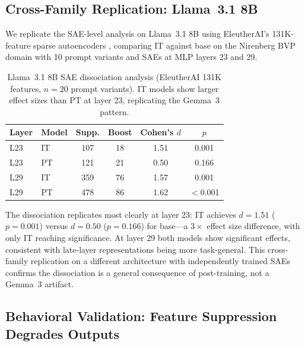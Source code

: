 \documentclass[10pt,twocolumn]{article}
\newcommand{\gemma}{Gemma~3\xspace}
\begin{document}
\subsection{Cross-Family Replication: Llama~3.1 8B}
\label{sec:llama_replication}

We replicate the SAE-level analysis on Llama~3.1 8B using EleutherAI's 131K-feature sparse autoencoders \citep{gao2024scaling}, comparing IT against base on the Nirenberg BVP domain with 10 prompt variants and SAEs at MLP layers 23 and 29.

\begin{table}[t]
\centering
\caption{Llama~3.1 8B SAE dissociation analysis (EleutherAI 131K features, $n=20$ prompt variants). IT models show larger effect sizes than PT at layer 23, replicating the \gemma pattern.}
\label{tab:llama_sae}
\small
\begin{tabular}{@{}llcccc@{}}
\toprule
\textbf{Layer} & \textbf{Model} & \textbf{Supp.} & \textbf{Boost} & \textbf{Cohen's $d$} & \textbf{$p$} \\
\midrule
L23 & IT  & 107 & 18 & 1.51 & 0.001 \\
L23 & PT  & 121 & 21 & 0.50 & 0.166 \\
L29 & IT  & 359 & 76 & 1.57 & 0.001 \\
L29 & PT  & 478 & 86 & 1.62 & $<$0.001 \\
\bottomrule
\end{tabular}
\end{table}

The dissociation replicates most clearly at layer 23: IT achieves $d = 1.51$ ($p = 0.001$) versus $d = 0.50$ ($p = 0.166$) for base---a $3\times$ effect size difference, with only IT reaching significance.
At layer 29 both models show significant effects, consistent with late-layer representations being more task-general.
This cross-family replication on a different architecture with independently trained SAEs confirms the dissociation is a general consequence of post-training, not a \gemma artifact.

\subsection{Behavioral Validation: Feature Suppression Degrades Outputs}
\label{sec:behavioral}
\end{document}
